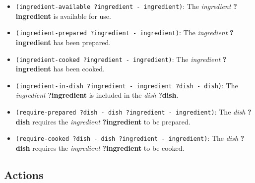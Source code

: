 \documentclass[a4paper,12pt]{article}
\begin{document}
\begin{itemize}
    \item \texttt{(ingredient-available ?ingredient - ingredient)}: The \textit{ingredient} \textbf{?ingredient} is available for use.
    \item \texttt{(ingredient-prepared ?ingredient - ingredient)}: The \textit{ingredient} \textbf{?ingredient} has been prepared.
    \item \texttt{(ingredient-cooked ?ingredient - ingredient)}: The \textit{ingredient} \textbf{?ingredient} has been cooked.
    \item \texttt{(ingredient-in-dish ?ingredient - ingredient ?dish - dish)}: The \textit{ingredient} \textbf{?ingredient} is included in the \textit{dish} \textbf{?dish}.
    \item \texttt{(require-prepared ?dish - dish ?ingredient - ingredient)}: The \textit{dish} \textbf{?dish} requires the \textit{ingredient} \textbf{?ingredient} to be prepared.
    \item \texttt{(require-cooked ?dish - dish ?ingredient - ingredient)}: The \textit{dish} \textbf{?dish} requires the \textit{ingredient} \textbf{?ingredient} to be cooked.
\end{itemize}

\subsection{Actions}
\end{document}
